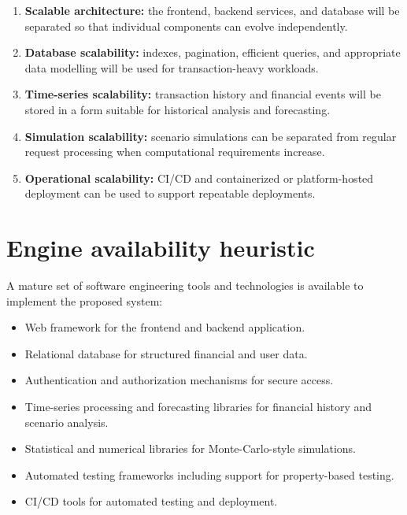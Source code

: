 \documentclass[11pt,a4paper]{article}
\begin{document}
\begin{enumerate}[leftmargin=0.7cm]

    \item \textbf{Scalable architecture:} the frontend, backend services, and
    database will be separated so that individual components can evolve
    independently.
    
    \item \textbf{Database scalability:} indexes, pagination, efficient
    queries, and appropriate data modelling will be used for transaction-heavy
    workloads.
    
    \item \textbf{Time-series scalability:} transaction history and financial
    events will be stored in a form suitable for historical analysis and
    forecasting.
    
    \item \textbf{Simulation scalability:} scenario simulations can be
    separated from regular request processing when computational requirements
    increase.
    
    \item \textbf{Operational scalability:} CI/CD and containerized or
    platform-hosted deployment can be used to support repeatable deployments.
    
\end{enumerate}


\section{Engine availability heuristic}

A mature set of software engineering tools and technologies is available to
implement the proposed system:

\begin{itemize}[leftmargin=0.7cm]
    \item Web framework for the frontend and backend application.
    
    \item Relational database for structured financial and user data.
    
    \item Authentication and authorization mechanisms for secure access.
    
    \item Time-series processing and forecasting libraries for financial
    history and scenario analysis.
    
    \item Statistical and numerical libraries for Monte-Carlo-style
    simulations.
    
    \item Automated testing frameworks including support for property-based
    testing.
    
    \item CI/CD tools for automated testing and deployment.
\end{itemize}
\end{document}

